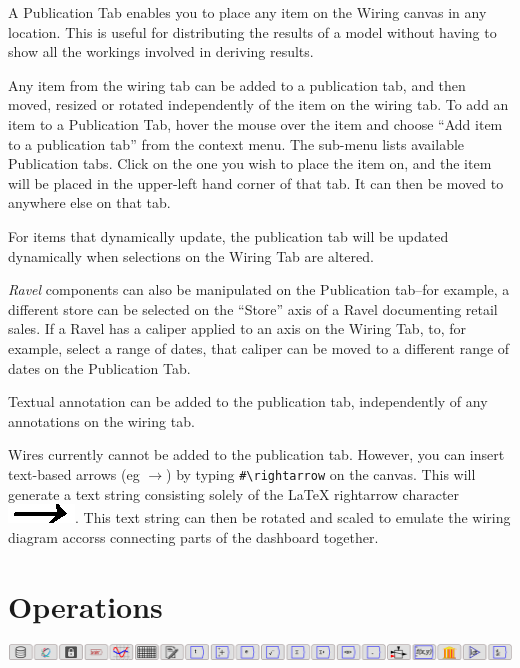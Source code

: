 A Publication Tab enables you to place any item on the Wiring canvas
in any location. This is useful for distributing the results of a
model without having to show all the workings involved in deriving
results.

Any item from the wiring tab can be added to a publication tab, and
then moved, resized or rotated independently of the item on the wiring
tab. To add an item to a Publication Tab, hover the mouse over the
item and choose ``Add item to a publication tab'' from the context
menu. The sub-menu lists available Publication tabs. Click on the
one you wish to place the item on, and the item will be placed in
the upper-left hand corner of that tab. It can then be moved to anywhere
else on that tab.

For items that dynamically update, the publication tab will be updated
dynamically when selections on the Wiring Tab are altered.

\emph{Ravel} components can also be manipulated on the Publication
tab--for example, a different store can be selected on the ``Store''
axis of a Ravel documenting retail sales. If a Ravel has a caliper
applied to an axis on the Wiring Tab, to, for example, select a range
of dates, that caliper can be moved to a different range of dates
on the Publication Tab.

Textual annotation can be added to the publication tab, independently
of any annotations on the wiring tab.

Wires currently cannot be added to the publication tab. However, you
can insert text-based arrows (eg $\rightarrow$) by typing \verb+#\rightarrow+
on the canvas. This will generate a text string consisting solely
of the LaTeX rightarrow character \includegraphics{images/rightarrow}.
This text string can then be rotated and scaled to emulate the wiring
diagram accorss connecting parts of the dashboard together.

\section{Operations}

\label{Operations}

\includegraphics{images/DesignIcons}

